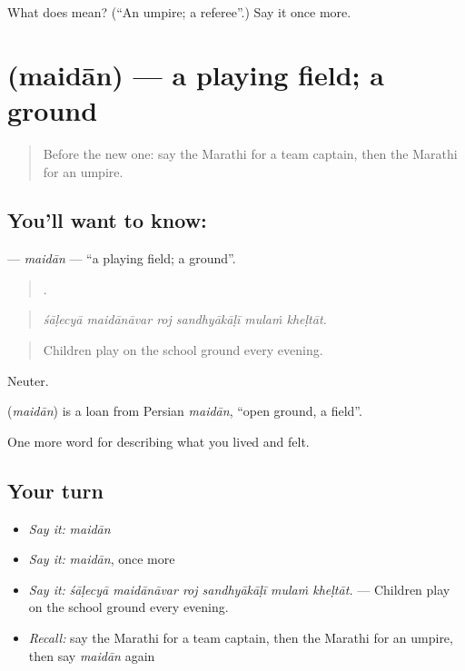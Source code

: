 \begin{tcolorbox}[breakable,colback=teal!4,colframe=teal!35!black,title={Before you move on}]
What does  mean? (\textquotedblleft{}An umpire; a referee\textquotedblright{}.) Say it once more.
\end{tcolorbox}
\section[\texorpdfstring{\mr{मैदान} (maidān)}{मैदान (maidān)}]{ (maidān) — a playing field; a ground}

\label{lesson:MR-C529-maidan}



\begin{quote}
Before the new one: say the Marathi for a team captain, then the Marathi for an umpire.
\end{quote}

\subsection*{You'll want to know: }
\textbf{} — \emph{maidān} — \textquotedblleft{}a playing field; a ground\textquotedblright{}.

\begin{quote}
     .
\end{quote}

\begin{quote}
\emph{śāḷecyā maidānāvar roj sandhyākāḷī mulaṁ kheḷtāt.}
\end{quote}

\begin{quote}
Children play on the school ground every evening.
\end{quote}

Neuter.

\begin{cousinweb}
\textbf{} (\emph{maidān}) is a loan from Persian \emph{maidān}, \textquotedblleft{}open ground, a field\textquotedblright{}.
\end{cousinweb}

\begin{grammarlens}[title={What you've built}]
One more word for describing what you lived and felt.
\end{grammarlens}

\subsection*{Your turn}
\begin{itemize}
\raggedright
  \item \emph{Say it:} \emph{maidān}
  \item \emph{Say it:} \emph{maidān}, once more
  \item \emph{Say it:} \emph{śāḷecyā maidānāvar roj sandhyākāḷī mulaṁ kheḷtāt.} — Children play on the school ground every evening.
  \item \emph{Recall:} say the Marathi for a team captain, then the Marathi for an umpire, then say \emph{maidān} again
\end{itemize}

